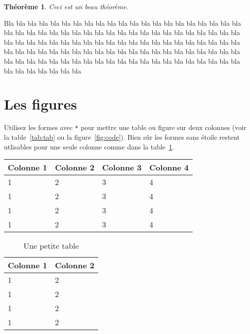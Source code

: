 \documentclass[twocolumn]{article}
\newtheorem{theorem}{Théorème}
\begin{document}
\begin{theorem}
  Ceci est un beau théorème.
\end{theorem}

Bla bla bla bla bla bla bla bla bla bla bla bla bla bla bla bla bla
bla bla bla bla bla bla bla bla bla bla bla bla bla bla bla bla bla
bla bla bla bla bla bla bla bla bla bla bla bla bla bla bla bla bla
bla bla bla bla bla bla bla bla bla bla bla bla bla bla bla bla bla
bla bla bla bla bla bla bla bla bla bla bla bla bla bla bla bla bla
bla bla bla bla bla bla bla bla bla bla bla bla bla bla bla bla bla
bla bla bla bla bla bla bla bla bla bla



\section{Les figures}
\label{sec:les-figures}
Utilisez les formes avec \texttt{*} pour mettre une table ou figure
sur deux colonnes (voir la table~\ref{tab:tab} ou la
figure~\ref{fig:code}). Bien sûr les formes sans étoile restent
utlisables pour une seule colonne comme dans la table~\ref{tab:tabcol}.

\begin{table*}[htbp]
  \centering
  \begin{tabular}{|l|l|l|l|}
    \hline
    \textbf{Colonne 1} & \textbf{Colonne 2} & \textbf{Colonne 3} &
    \textbf{Colonne 4} \\ \hline
    1 & 2 & 3 & 4 \\ 
    1 & 2 & 3 & 4 \\ 
    1 & 2 & 3 & 4 \\ 
    1 & 2 & 3 & 4 \\ \hline
  \end{tabular}
  \caption{Une grande table}
  \label{tab:tab}
\end{table*}

\begin{table}[htbp]
  \centering
  \begin{tabular}{|l|l|}
    \hline
    \textbf{Colonne 1} & \textbf{Colonne 2}  \\ \hline
    1 & 2 \\ 
    1 & 2 \\ 
    1 & 2 \\ 
    1 & 2 \\ \hline
  \end{tabular}
  \caption{Une petite table}
  \label{tab:tabcol}
\end{table}
\end{document}
